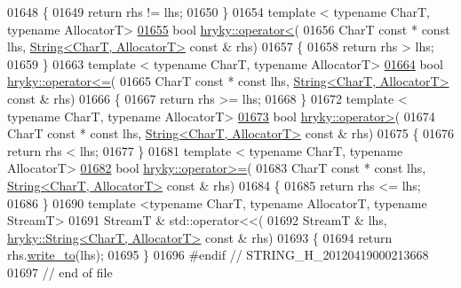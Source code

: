 \begin{DoxyCode}
01648 \{
01649     \textcolor{keywordflow}{return} rhs != lhs;
01650 \}
01654 \textcolor{keyword}{template} < \textcolor{keyword}{typename} CharT, \textcolor{keyword}{typename} AllocatorT>
\hypertarget{string_8h_source_l01655}{}\hyperlink{namespacehryky_a7db2acd798ff6883387f9cbe3b3e820d}{01655} \textcolor{keywordtype}{bool} \hyperlink{namespacehryky_a7db2acd798ff6883387f9cbe3b3e820d}{hryky::operator<}(
01656     CharT \textcolor{keyword}{const} * \textcolor{keyword}{const} lhs, \hyperlink{classhryky_1_1_string}{String<CharT, AllocatorT>} \textcolor{keyword}{const} & rhs)
01657 \{
01658     \textcolor{keywordflow}{return} rhs > lhs;
01659 \}
01663 \textcolor{keyword}{template} < \textcolor{keyword}{typename} CharT, \textcolor{keyword}{typename} AllocatorT>
\hypertarget{string_8h_source_l01664}{}\hyperlink{namespacehryky_a3841c4dbefd9eeed038376b3044dec2b}{01664} \textcolor{keywordtype}{bool} \hyperlink{namespacehryky_a3841c4dbefd9eeed038376b3044dec2b}{hryky::operator<=}(
01665     CharT \textcolor{keyword}{const} * \textcolor{keyword}{const} lhs, \hyperlink{classhryky_1_1_string}{String<CharT, AllocatorT>} \textcolor{keyword}{const} & rhs)
01666 \{
01667     \textcolor{keywordflow}{return} rhs >= lhs;
01668 \}
01672 \textcolor{keyword}{template} < \textcolor{keyword}{typename} CharT, \textcolor{keyword}{typename} AllocatorT>
\hypertarget{string_8h_source_l01673}{}\hyperlink{namespacehryky_af7f213d8e2d7f4c75ac2c93d7be56365}{01673} \textcolor{keywordtype}{bool} \hyperlink{namespacehryky_af7f213d8e2d7f4c75ac2c93d7be56365}{hryky::operator>}(
01674     CharT \textcolor{keyword}{const} * \textcolor{keyword}{const} lhs, \hyperlink{classhryky_1_1_string}{String<CharT, AllocatorT>} \textcolor{keyword}{const} & rhs)
01675 \{
01676     \textcolor{keywordflow}{return} rhs < lhs;
01677 \}
01681 \textcolor{keyword}{template} < \textcolor{keyword}{typename} CharT, \textcolor{keyword}{typename} AllocatorT>
\hypertarget{string_8h_source_l01682}{}\hyperlink{namespacehryky_acc487ba69503ce030df6f4b9db4cbe8b}{01682} \textcolor{keywordtype}{bool} \hyperlink{namespacehryky_acc487ba69503ce030df6f4b9db4cbe8b}{hryky::operator>=}(
01683     CharT \textcolor{keyword}{const} * \textcolor{keyword}{const} lhs, \hyperlink{classhryky_1_1_string}{String<CharT, AllocatorT>} \textcolor{keyword}{const} & rhs)
01684 \{
01685     \textcolor{keywordflow}{return} rhs <= lhs;
01686 \}
01690 \textcolor{keyword}{template} <\textcolor{keyword}{typename} CharT, \textcolor{keyword}{typename} AllocatorT, \textcolor{keyword}{typename} StreamT>
01691 StreamT & std::operator<<(
01692     StreamT & lhs, \hyperlink{classhryky_1_1_string}{hryky::String<CharT, AllocatorT>} \textcolor{keyword}{const} & rhs)
01693 \{
01694     \textcolor{keywordflow}{return} rhs.\hyperlink{classhryky_1_1_string_a5632cb3b6a55de35a0d2c03ddbe8f75e}{write_to}(lhs);
01695 \}
01696 \textcolor{preprocessor}{#endif // STRING\_H\_20120419000213668}
01697 \textcolor{preprocessor}{}\textcolor{comment}{// end of file}
\end{DoxyCode}
